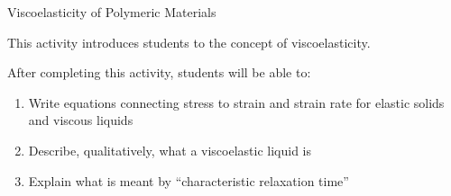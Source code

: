 %
%
%
%

\renewcommand{\figpath}{content/polymphys/mechanical-properties/viscoelasticity/figs}
\renewcommand{\labelbase}{viscoelasticity}

\begin{activity}{Viscoelasticity of Polymeric Materials}

\begin{instructornotes}

	This activity introduces students to the concept of viscoelasticity.
	
	After completing this activity, students will be able to:
			\begin{enumerate}
				\item Write equations connecting stress to strain and strain rate for elastic solids and viscous liquids
				\item Describe, qualitatively, what a viscoelastic liquid is
				\item Explain what is meant by ``characteristic relaxation time''
			\end{enumerate}
	
			

\end{instructornotes}
\end{activity}
